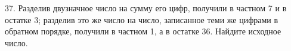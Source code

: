 37. Разделив двузначное число на сумму его цифр, получили в частном 7 и в остатке 3; разделив это же число на число, записанное теми же цифрами в обратном порядке, получили в частном 1, а в остатке 36. Найдите исходное число.\\
